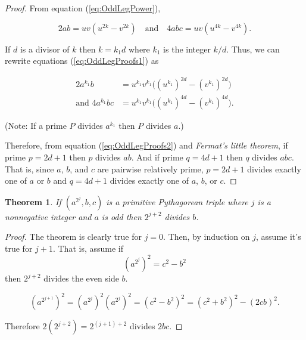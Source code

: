 \documentclass{article}
\newtheorem{theorem}{Theorem}
\theoremstyle{definition}
\begin{document}
\begin{proof}
From equation (\ref{eq:OddLegPower}),

\begin{equation}
2ab = uv\left(u^{2k} - v^{2k}\right) \quad\text{and}\quad 4abc = uv\left(u^{4k} - v^{4k}\right).
\label{eq:OddLegProofs1}
\end{equation}

If \(d\) is a divisor of \(k\) then \(k=k_1d\) where \(k_1\) is the integer \(k/d\). Thus, we can rewrite equations (\ref{eq:OddLegProofs1}) as

\begin{equation}\begin{aligned}
2a^{k_1}b &= u^{k_1}v^{k_1} \big((u^{k_1})^{2d}-(v^{k_1})^{2d}\big) \\ \text{and } 4a^{k_1}bc &= u^{k_1}v^{k_1} \big((u^{k_1})^{4d}-(v^{k_1})^{4d}\big).
\end{aligned}
\label{eq:OddLegProofs2}
\end{equation}

(Note: If a prime \(P\) divides \(a^{k_1}\) then \(P\) divides \(a\).)

Therefore, from equation (\ref{eq:OddLegProofs2}) and \textit{Fermat's little theorem}, if prime \(p=2d+1\) then \(p\) divides \(ab\). And if prime \(q=4d+1\) then \(q\) divides \(abc\). That is, since \(a\), \(b\), and \(c\) are pairwise relatively prime, \(p=2d+1\) divides exactly one of \(a\) or \(b\) and \(q=4d+1\) divides exactly one of \(a\), \(b\), or \(c\).
\end{proof}

\begin{theorem}
If \((a^{2^j},b,c)\) is a primitive Pythagorean triple where \(j\) is a nonnegative integer and \(a\) is odd then \(2^{j+2}\) divides \(b\).
\end{theorem}

\begin{proof}
The theorem is clearly true for \(j=0\). Then, by induction on \(j\), assume it's true for \(j+1\). That is, assume if \[(a^{2^j})^2=c^2-b^2 \] then \(2^{j+2}\) divides the even side \(b\).

\[ (a^{2^{j+1}})^2 = (a^{2^j})^2 (a^{2^j})^2 = (c^2-b^2)^2 = (c^2+b^2)^2 - (2cb)^2. \]

Therefore \(2(2^{j+2}) = 2^{(j+1)+2}\) divides \(2bc\).
\end{proof}
\end{document}
